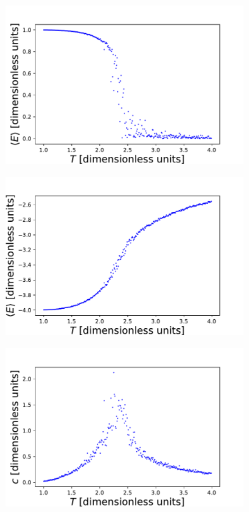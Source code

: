 \documentclass[10 pt, a4paper]{article}
\begin{document}
\begin{figure}[H] 
\begin{subfigure}[b]{0.33\textwidth}
  \centering
    \includegraphics[width=\textwidth]{mMCMC}
\end{subfigure}
\begin{subfigure}[b]{0.33\textwidth} 
  \centering
    \includegraphics[width=\textwidth]{eMCMC}
\end{subfigure}
\begin{subfigure}[b]{0.33\textwidth} 
  \centering
    \includegraphics[width=\textwidth]{cMCMC}

\end{subfigure}
\end{figure}
\end{document}
